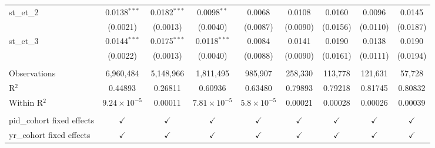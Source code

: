 \documentclass[
  11pt,
]{article}
\begin{document}
\begin{adjustbox}{max width=\textwidth}
\begin{tabular}{lcccccccc}
   st\_et\_2                  & 0.0138$^{***}$        & 0.0182$^{***}$ & 0.0098$^{**}$         & 0.0068                    & 0.0108        & 0.0160                    & 0.0096        & 0.0145\\   
                              & (0.0021)              & (0.0013)       & (0.0040)              & (0.0087)                  & (0.0090)      & (0.0156)                  & (0.0110)      & (0.0187)\\   
   st\_et\_3                  & 0.0144$^{***}$        & 0.0175$^{***}$ & 0.0118$^{***}$        & 0.0084                    & 0.0141        & 0.0190                    & 0.0138        & 0.0190\\   
                              & (0.0022)              & (0.0013)       & (0.0040)              & (0.0088)                  & (0.0090)      & (0.0161)                  & (0.0111)      & (0.0194)\\   
    \\
   Observations               & 6,960,484             & 5,148,966      & 1,811,495             & 985,907                   & 258,330       & 113,778                   & 121,631       & 57,728\\  
   R$^2$                      & 0.44893               & 0.26811        & 0.60936               & 0.63480                   & 0.79893       & 0.79218                   & 0.81745       & 0.80832\\  
   Within R$^2$               & $9.24\times 10^{-5}$  & 0.00011        & $7.81\times 10^{-5}$  & $5.8\times 10^{-5}$       & 0.00021       & 0.00028                   & 0.00026       & 0.00039\\  
    \\
   pid\_cohort fixed effects  & $\checkmark$          & $\checkmark$   & $\checkmark$          & $\checkmark$              & $\checkmark$  & $\checkmark$              & $\checkmark$  & $\checkmark$\\   
   yr\_cohort fixed effects   & $\checkmark$          & $\checkmark$   & $\checkmark$          & $\checkmark$              & $\checkmark$  & $\checkmark$              & $\checkmark$  & $\checkmark$\\   
   \bottomrule
\end{tabular}
\par\endgroup



\end{adjustbox}
\end{document}
